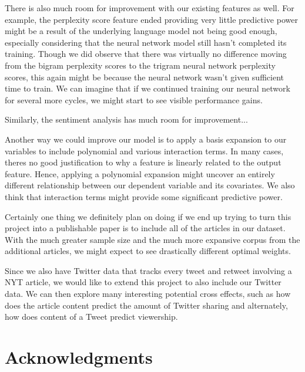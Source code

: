 \documentclass[fleqn,12pt]{SelfArx} %
\begin{document}
There is also much room for improvement with our existing features as well. For example, the perplexity score feature ended providing very little predictive power might be a result of the underlying language model not being good enough, especially considering that the neural network model still hasn't completed its training. Though we did observe that there was virtually no difference moving from the bigram perplexity scores to the trigram neural network perplexity scores, this again might be because the neural network wasn't given sufficient time to train. We can imagine that if we continued training our neural network for several more cycles, we might start to see visible performance gains. 

Similarly, the sentiment analysis has much room for improvement...

Another way we could improve our model is to apply a basis expansion to our variables to include polynomial and various interaction terms. In many cases, theres no good justification to why a feature is linearly related to the output feature. Hence, applying a polynomial expansion might uncover an entirely different relationship between our dependent variable and its covariates. We also think that interaction terms might provide some significant predictive power. 

Certainly one thing we definitely plan on doing if we end up trying to turn this project into a publishable paper is to include all of the articles in our dataset. With the much greater sample size and the much more expansive corpus from the additional articles, we might expect to see drastically different optimal weights. 

Since we also have Twitter data that tracks every tweet and retweet involving a NYT article, we would like to extend this project to also include our Twitter data. We can then explore many interesting potential cross effects, such as how does the article content predict the amount of Twitter sharing and alternately, how does content of a Tweet predict viewership.
\section*{Acknowledgments} %





\end{document}

